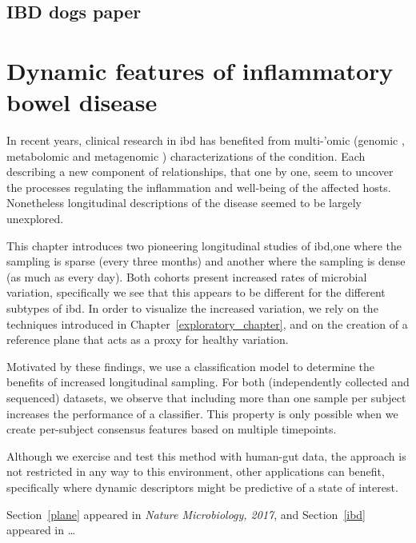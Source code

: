 \documentclass[12pt,chapterheads]{ucsd}
\begin{document}
\ifdefined\RELEASE
    
\else
    \section{IBD dogs paper}\label{dogs}
\fi

\chapter{Dynamic features of inflammatory bowel disease}\label{chapter_ibds}

In recent years, clinical research in \gls{ibd} has benefited from multi-'omic 
(genomic \cite{RN4217}, metabolomic \cite{RN4264} and metagenomic 
\cite{RN4263}) characterizations of the condition. Each describing a new 
component of relationships, that one by one, seem to uncover the processes 
regulating the inflammation and well-being of the affected hosts. Nonetheless 
longitudinal descriptions of the disease seemed to be largely unexplored.

This chapter introduces two pioneering longitudinal studies of \gls{ibd},one 
where the sampling is sparse (every three months) and another where the 
sampling is dense (as much as every day). Both cohorts present increased rates 
of microbial variation, specifically we see that this appears to be different 
for the different subtypes of \gls{ibd}. In order to visualize the increased 
variation, we rely on the techniques introduced in 
Chapter~\ref{exploratory_chapter}, and on the creation of a reference plane 
that acts as a proxy for healthy variation.

Motivated by these findings, we use a classification model to determine the 
benefits of increased longitudinal sampling. For both (independently collected 
and sequenced) datasets, we observe that including more than one sample per 
subject increases the performance of a classifier. This property is only 
possible when we create per-subject consensus features based on multiple 
timepoints.

Although we exercise and test this method with human-gut data, the approach is 
not restricted in any way to this environment, other applications can benefit, 
specifically where dynamic descriptors might be predictive of a state of 
interest.

Section~\ref{plane} appeared in \textsl{Nature Microbiology, 2017}, and 
Section~\ref{ibd} appeared in \dots

\ifdefined\RELEASE
    
    
\else
\end{document}
